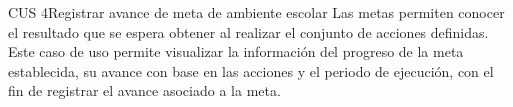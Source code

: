 
\begin{UseCase}{CUS 4}{Registrar avance de meta de ambiente escolar}
{
    Las metas permiten conocer el resultado que se espera obtener al realizar el conjunto de acciones definidas. Este caso de uso permite visualizar la información del progreso de la meta establecida, su avance con base en las acciones y el periodo de ejecución, con el fin de registrar el avance asociado a la meta.
}
    

    


\end{UseCase}
